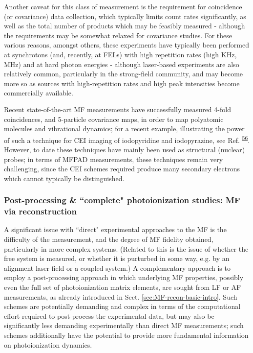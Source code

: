 \documentclass[10pt]{article}
\begin{document}
Another caveat for this class of measurement is the requirement for coincidence (or covariance) data collection, which typically limits count rates significantly, as well as the total number of products which may be feasibly measured - although the requirements may be somewhat relaxed for covariance studies. For these various reasons, amongst others, these experiments have typically been performed at synchrotons (and, recently, at FELs) with high repetition rates (high KHz, MHz) and at hard photon energies - although laser-based experiments are also relatively common, particularly in the strong-field community, and may become more so as sources with high-repetition rates and high peak intensities become commercially available. 

Recent state-of-the-art MF measurements have successfully measured 4-fold coincidences, and 5-particle covariance maps, in order to map polyatomic molecules and vibrational dynamics; %
for a recent example, illustrating the power of such a technique for CEI imaging of iodopyridine and iodopyrazine, see Ref.   \textsuperscript{\hyperref[csl:56]{56}}. However, to date these techniques have mainly been used as structural (nuclear) probes; in terms of MFPAD measurements, these techniques remain very challenging, since the CEI schemes required produce many secondary electrons which cannot typically be distinguished. 



\subsubsection{Post-processing \& ``complete" photoionization studies: MF via reconstruction\label{sec:MF-recon-expt}}


A significant issue with ``direct" experimental approaches to the MF is the difficulty of the measurement, and the degree of MF fidelity obtained, particularly in more complex systems. (Related to this is the issue of whether the free system is measured, or whether it is purturbed in some way, e.g. by an alignment laser field or a coupled system.) A complementary approach is to employ a post-processing approach in which underlying MF properties, possibly even the full set of photoionization matrix elements, are sought from LF or AF measurements, as already introduced in Sect. \ref{sec:MF-recon-basic-intro}. Such schemes are potentially demanding and complex in terms of the computational effort required to post-process the experimental data, but may also be significantly less demanding experimentally than direct MF measurements; such schemes additionally have the potential to provide more fundamental information on photoionization dynamics.
\end{document}
